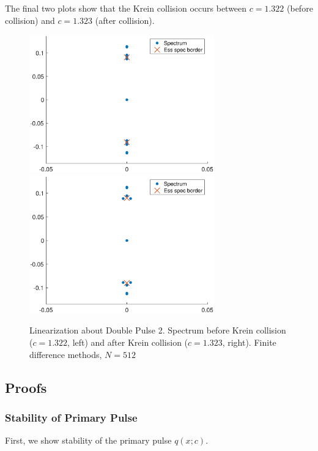\documentclass[12pt]{article}
\begin{document}
The final two plots show that the Krein collision occurs between $c = 1.322$ (before collision) and $c = 1.323$ (after collision).

\begin{figure}[H]
\centering
\includegraphics[width=8cm]{spec1322_double2.eps}
\includegraphics[width=8cm]{spec1323_double2.eps}
\caption{Linearization about Double Pulse 2. Spectrum before Krein collision ($c = 1.322$, left) and after Krein collision ($c = 1.323$, right). Finite difference methods, $N = 512$}
\end{figure}
 
\subsection{Proofs}

\subsubsection{Stability of Primary Pulse}

First, we show stability of the primary pulse $q(x; c)$.

\end{document}
